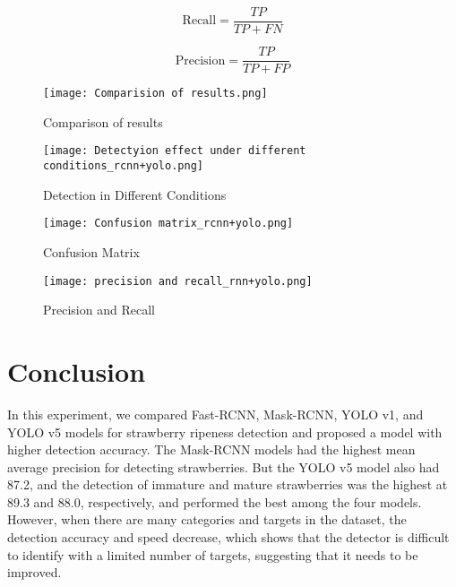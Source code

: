 \documentclass{ws-ijprai}
\begin{document}
\begin{equation}
\text{Recall} = \frac{TP}{TP + FN}
\end{equation}

\begin{equation}
\text{Precision} = \frac{TP}{TP + FP}
\end{equation}




\begin{figure}
    \centering
    \texttt{[image: Comparision of results.png]}
    \caption{Comparison of results}
    \label{fig:enter-label}
\end{figure}

\begin{figure}
    \centering
    \texttt{[image: Detectyion effect under different conditions\_rcnn+yolo.png]}
    \caption{Detection in Different Conditions}
    \label{fig:enter-label}
\end{figure}

\begin{figure}
    \centering
    \texttt{[image: Confusion matrix\_rcnn+yolo.png]}
    \caption{Confusion Matrix}
    \label{fig:enter-label}
\end{figure}


\begin{figure}
    \centering
    \texttt{[image: precision and recall\_rnn+yolo.png]}
    \caption{Precision and Recall}
    \label{fig:enter-label}
\end{figure}





\section{Conclusion}

In this experiment, we compared Fast-RCNN, Mask-RCNN, YOLO v1, and YOLO v5 models for strawberry ripeness detection and proposed a model with higher detection accuracy. The Mask-RCNN models had the highest mean average precision for detecting strawberries. But the YOLO v5 model also had 87.2, and the detection of immature and mature strawberries was the highest at 89.3 and 88.0, respectively, and performed the best among the four models. However, when there are many categories and targets in the dataset, the detection accuracy and speed decrease, which shows that the detector is difficult to identify with a limited number of targets, suggesting that it needs to be improved.
\end{document}
